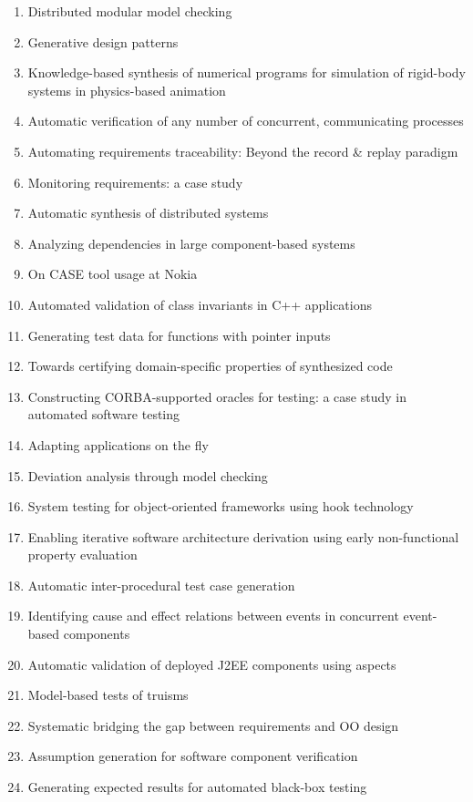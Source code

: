 \begin{enumerate}[itemsep=-1ex]
  \item Distributed modular model checking
  \item Generative design patterns
  \item Knowledge-based synthesis of numerical programs for simulation of rigid-body systems in physics-based animation
  \item Automatic verification of any number of concurrent, communicating processes
  \item Automating requirements traceability: Beyond the record \& replay paradigm
  \item Monitoring requirements: a case study
  \item Automatic synthesis of distributed systems
  \item Analyzing dependencies in large component-based systems
  \item On CASE tool usage at Nokia
  \item Automated validation of class invariants in C++ applications
  \item Generating test data for functions with pointer inputs
  \item Towards certifying domain-specific properties of synthesized code
  \item Constructing CORBA-supported oracles for testing: a case study in automated software testing
  \item Adapting applications on the fly
  \item Deviation analysis through model checking
  \item System testing for object-oriented frameworks using hook technology
  \item Enabling iterative software architecture derivation using early non-functional property evaluation
  \item Automatic inter-procedural test case generation
  \item Identifying cause and effect relations between events in concurrent event-based components
  \item Automatic validation of deployed J2EE components using aspects
  \item Model-based tests of truisms
  \item Systematic bridging the gap between requirements and OO design
  \item Assumption generation for software component verification
  \item Generating expected results for automated black-box testing 
\end{enumerate}


